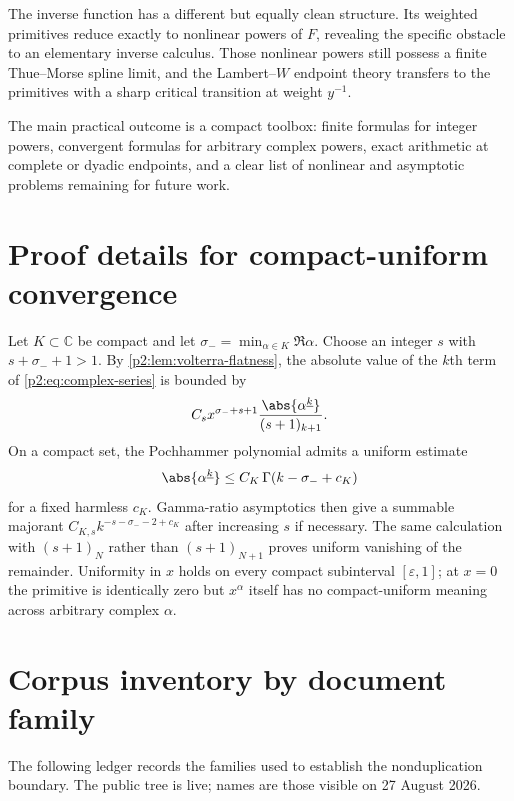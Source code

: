 \documentclass[11pt,oneside]{article}
\theoremstyle{definition}
\theoremstyle{remark}
\newcommand{\C}{\mathbb C}
\newcommand{\fall}[2]{#1^{\underline{#2}}}
\newcommand{\1}{\mathbf 1}
\begin{document}
The inverse function has a different but equally clean structure.  Its
weighted primitives reduce exactly to nonlinear powers of $F$, revealing the
specific obstacle to an elementary inverse calculus.  Those nonlinear powers
still possess a finite Thue--Morse spline limit, and the Lambert--$W$ endpoint
theory transfers to the primitives with a sharp critical transition at weight
$y^{-1}$.

The main practical outcome is a compact toolbox: finite formulas for integer
powers, convergent formulas for arbitrary complex powers, exact arithmetic at
complete or dyadic endpoints, and a clear list of nonlinear and asymptotic
problems remaining for future work.

\appendix
\section{Proof details for compact-uniform convergence}
\label{p2:app:uniform}

Let $K\subset\C$ be compact and let
$\sigma_- =\min_{\alpha\in K}\Re\alpha$.  Choose an integer $s$ with
$s+\sigma_-+1>1$.  By \cref{p2:lem:volterra-flatness}, the absolute value of the
$k$th term of \eqref{p2:eq:complex-series} is bounded by
\begin{equation}
 C_s x^{\sigma_-+s+1}
 \frac{\abs{\fall{\alpha}{k}}}{(s+1)_{k+1}}.              \label{p2:eq:uniform-term-bound}
\end{equation}
On a compact set, the Pochhammer polynomial admits a uniform estimate
\begin{equation}
 \abs{\fall{\alpha}{k}}\le C_K\,\Gamma(k-\sigma_-+c_K)   \label{p2:eq:pochhammer-uniform}
\end{equation}
for a fixed harmless $c_K$.  Gamma-ratio asymptotics then give a summable
majorant $C_{K,s}k^{-s-\sigma_- -2+c_K}$ after increasing $s$ if necessary.
The same calculation with $(s+1)_N$ rather than $(s+1)_{N+1}$ proves uniform
vanishing of the remainder.  Uniformity in $x$ holds on every compact
subinterval $[\varepsilon,1]$; at $x=0$ the primitive is identically zero but
$x^\alpha$ itself has no compact-uniform meaning across arbitrary complex
$\alpha$.

\section{Corpus inventory by document family}
\label{p2:app:corpus}

The following ledger records the families used to establish the nonduplication
boundary.  The public tree is live; names are those visible on 27 August 2026.
\end{document}
